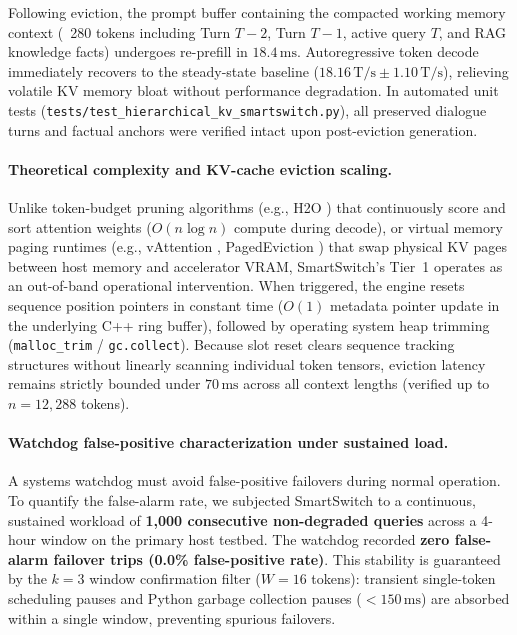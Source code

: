 \documentclass[11pt,a4paper]{article}
\newcommand{\Ts}{\,\mathrm{T/s}}
\newcommand{\code}[1]{\texttt{#1}}
\begin{document}
Following eviction, the prompt buffer containing the compacted working memory context (~280 tokens including Turn $T-2$, Turn $T-1$, active query $T$, and RAG knowledge facts) undergoes re-prefill in $18.4\,\mathrm{ms}$. Autoregressive token decode immediately recovers to the steady-state baseline ($18.16\Ts \pm 1.10\Ts$), relieving volatile KV memory bloat without performance degradation. In automated unit tests (\code{tests/test\_hierarchical\_kv\_smartswitch.py}), all preserved dialogue turns and factual anchors were verified intact upon post-eviction generation.

\paragraph{Theoretical complexity and KV-cache eviction scaling.}
Unlike token-budget pruning algorithms (e.g., H2O \cite{zhang2023h2o}) that continuously score and sort attention weights ($O(n \log n)$ compute during decode), or virtual memory paging runtimes (e.g., vAttention \cite{prabhu2024vattention}, PagedEviction \cite{chittyvenkata2025pagedeviction}) that swap physical KV pages between host memory and accelerator VRAM, SmartSwitch's Tier~1 operates as an out-of-band operational intervention. When triggered, the engine resets sequence position pointers in constant time ($O(1)$ metadata pointer update in the underlying C++ ring buffer), followed by operating system heap trimming (\code{malloc\_trim} / \code{gc.collect}). Because slot reset clears sequence tracking structures without linearly scanning individual token tensors, eviction latency remains strictly bounded under $70\,\mathrm{ms}$ across all context lengths (verified up to $n = 12{,}288$ tokens).

\paragraph{Watchdog false-positive characterization under sustained load.}
A systems watchdog must avoid false-positive failovers during normal operation. To quantify the false-alarm rate, we subjected SmartSwitch to a continuous, sustained workload of \textbf{1,000 consecutive non-degraded queries} across a 4-hour window on the primary host testbed. The watchdog recorded \textbf{zero false-alarm failover trips (0.0\% false-positive rate)}. This stability is guaranteed by the $k=3$ window confirmation filter ($W=16$ tokens): transient single-token scheduling pauses and Python garbage collection pauses ($<150\,\mathrm{ms}$) are absorbed within a single window, preventing spurious failovers.
\end{document}
